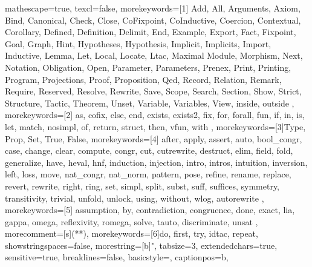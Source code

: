 
 {
mathescape=true,						
texcl=false,
morekeywords=[1]{
  Add,
  All,
  Arguments,
  Axiom,
  Bind,
  Canonical,
  Check,
  Close,
  CoFixpoint,
  CoInductive,
  Coercion,
  Contextual,
  Corollary,
  Defined,
  Definition,
  Delimit,
  End,
  Example,
  Export,
  Fact,
  Fixpoint,
  Goal,
  Graph,
  Hint,
  Hypotheses,
  Hypothesis,
  Implicit,
  Implicits,
  Import,
  Inductive,
  Lemma,
  Let,
  Local,
  Locate,
  Ltac,
  Maximal
  Module,
  Morphism,
  Next,
  Notation,
  Obligation,
  Open,
  Parameter,
  Parameters,
  Prenex,
  Print,
  Printing,
  Program,
  Projections,
  Proof,
  Proposition,
  Qed,
  Record,
  Relation,
  Remark,
  Require,
  Reserved,
  Resolve,
  Rewrite,
  Save,
  Scope,
  Search,
  Section,
  Show,
  Strict,
  Structure,
  Tactic,
  Theorem,
  Unset,
  Variable,
  Variables,
  View,
  inside,
  outside
},
morekeywords=[2]{
  as,
  cofix,
  else,
  end,
  exists,
  exists2,
  fix,
  for,
  forall,
  fun,
  if,
  in,
  is,
  let,
  match,
  nosimpl,
  of,
  return,
  struct,
  then,
  vfun,
  with
},
morekeywords=[3]{Type, Prop, Set, True, False},
morekeywords=[4]{
  after,
  apply,
  assert,
  auto,
  bool_congr,
  case,
  change,
  clear,
  compute,
  congr,
  cut,
  cutrewrite,
  destruct,
  elim,
  field,
  fold,
  generalize,
  have,
  heval, 
  hnf,
  induction,
  injection,
  intro,
  intros,
  intuition,
  inversion,
  left,
  loss,
  move,
  nat_congr,
  nat_norm,
  pattern,
  pose,
  refine,
  rename,
  replace,
  revert,
  rewrite,
  right,
  ring,
  set,
  simpl,
  split,
  subst,
  suff,
  suffices,
  symmetry,
  transitivity,
  trivial,
  unfold,
  unlock,
  using,
  without,
  wlog,
  autorewrite
},        
morekeywords=[5]{
  assumption,
  by,
  contradiction,
  congruence,
  done,
  exact,
  lia,
  gappa,
  omega,
  reflexivity,
  romega,
  solve,
  tauto,
  discriminate,
  unsat
},
morecomment=[s]{(*}{*)},
morekeywords=[6]{do, first, try, idtac, repeat},
showstringspaces=false,
morestring=[b]",
tabsize=3,							
extendedchars=true,  		 		
sensitive=true, 
breaklines=false,
basicstyle=\normalsize\ttfamily,
captionpos=b,							
}
